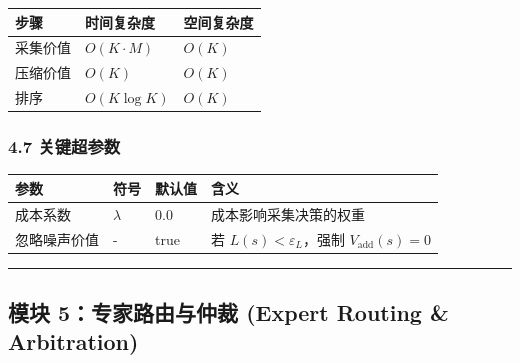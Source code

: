 \documentclass[
  12pt,
]{ctexart}
\begin{document}
\begin{longtable}[]{@{}lll@{}}
\toprule\noalign{}
步骤 & 时间复杂度 & 空间复杂度 \\
\midrule\noalign{}
\endhead
\bottomrule\noalign{}
\endlastfoot
采集价值 & \(O(K \cdot M)\) & \(O(K)\) \\
压缩价值 & \(O(K)\) & \(O(K)\) \\
排序 & \(O(K \log K)\) & \(O(K)\) \\
\end{longtable}

\subsubsection{4.7 关键超参数}\label{ux5173ux952eux8d85ux53c2ux6570-3}

\begin{longtable}[]{@{}
  >{\raggedright\arraybackslash}p{}
  >{\raggedright\arraybackslash}p{}
  >{\raggedright\arraybackslash}p{}
  >{\raggedright\arraybackslash}p{}@{}}
\toprule\noalign{}
\begin{minipage}[b]{\linewidth}\raggedright
参数
\end{minipage} & \begin{minipage}[b]{\linewidth}\raggedright
符号
\end{minipage} & \begin{minipage}[b]{\linewidth}\raggedright
默认值
\end{minipage} & \begin{minipage}[b]{\linewidth}\raggedright
含义
\end{minipage} \\
\midrule\noalign{}
\endhead
\bottomrule\noalign{}
\endlastfoot
成本系数 & \(\lambda\) & \(0.0\) & 成本影响采集决策的权重 \\
忽略噪声价值 & - & true & 若 \(L(s) < \varepsilon_L\)，强制
\(V_{\text{add}}(s)=0\) \\
\end{longtable}

\begin{center}\rule{0.5\linewidth}{0.5pt}\end{center}

\subsection{模块 5：专家路由与仲裁 (Expert Routing \&
Arbitration)}\label{ux6a21ux5757-5ux4e13ux5bb6ux8defux7531ux4e0eux4ef2ux88c1-expert-routing-arbitration}
\end{document}

